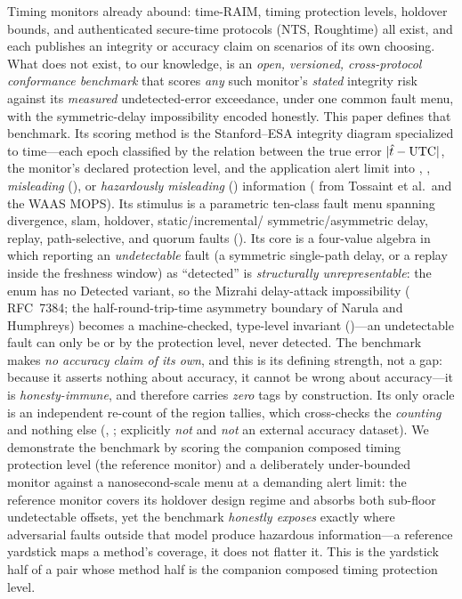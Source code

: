 Timing monitors already abound: time-RAIM, timing protection levels, holdover
bounds, and authenticated secure-time protocols (NTS, Roughtime) all exist, and
each publishes an integrity or accuracy claim on scenarios of its own choosing. What does not exist, to our knowledge, is an \emph{open, versioned,
cross-protocol conformance benchmark} that scores \emph{any} such monitor's
\emph{stated} integrity risk against its \emph{measured} undetected-error
exceedance, under one common fault menu, with the symmetric-delay impossibility
encoded honestly. This paper defines that benchmark. Its scoring method is the
Stanford--ESA integrity diagram specialized to time---each epoch classified by
the relation between the true error $|\hat t-\mathrm{UTC}|$, the monitor's declared
protection level, and the application alert limit into \Nominal{}, \Unavail{},
\emph{misleading} (\MI{}), or \emph{hazardously misleading} (\HMI{}) information
(\Cited{} from Tossaint et al.\ and the WAAS MOPS). Its stimulus is a parametric
ten-class fault menu spanning divergence, slam, holdover, static/incremental/
symmetric/asymmetric delay, replay, path-selective, and quorum faults
(\Modelled{}). Its core is a four-value  algebra in which reporting
an \emph{undetectable} fault (a symmetric single-path delay, or a replay inside
the freshness window) as ``detected'' is \emph{structurally unrepresentable}: the
enum has no \textsf{Detected} variant, so the Mizrahi delay-attack impossibility
(\Cited{} RFC~7384; the half-round-trip-time asymmetry boundary of Narula and
Humphreys) becomes a machine-checked, type-level invariant (\Proven{})---an
undetectable fault can only be \Absorbed{} or \Unabsorbed{} by the protection
level, never detected. The benchmark makes \emph{no accuracy claim of its own},
and this is its defining strength, not a gap: because it asserts nothing about
accuracy, it cannot be wrong about accuracy---it is \emph{honesty-immune}, and
therefore carries \emph{zero} \Validated{} tags by construction. Its only oracle
is an independent  re-count of the region tallies, which cross-checks
the \emph{counting} and nothing else (\Modelled{}, ;
explicitly \emph{not} \Validated{} and \emph{not} an external accuracy dataset).
We demonstrate the benchmark by scoring the companion composed timing protection
level (the reference monitor) and a deliberately under-bounded monitor against a
nanosecond-scale menu at a demanding alert limit: the reference monitor covers
its holdover design regime and absorbs both sub-floor undetectable offsets, yet
the benchmark \emph{honestly exposes} exactly where adversarial faults outside
that model produce hazardous information---a reference yardstick maps a method's
coverage, it does not flatter it. This is the yardstick half of a pair whose
method half is the companion composed timing protection level.
